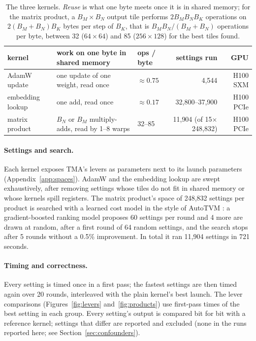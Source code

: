 \documentclass[10pt]{article}
\newcommand{\x}{\ensuremath{\times}}
\begin{document}
\begin{table}[t]
  \centering
  \caption{The three kernels. \emph{Reuse} is what one byte meets once it is in shared memory; for the matrix product,
  a $B_M \times B_N$ output tile performs $2B_MB_NB_K$ operations on $2(B_M+B_N)B_K$ bytes per step of $B_K$, that is
  $B_MB_N/(B_M+B_N)$ operations per byte, between 32 ($64\times64$) and 85 ($256\times128$) for the best tiles found.}
  \label{tab:kernels}
  \small
  \begin{tabular}{@{}lllrr@{}}
    \toprule
    kernel & work on one byte in shared memory & ops / byte & settings run & GPU \\
    \midrule
    AdamW update      & one update of one weight, read once            & $\approx 0.75$ & 4{,}544                     & H100 SXM  \\
    embedding lookup  & one add, read once                             & $\approx 0.17$ & 32{,}800--37{,}900          & H100 PCIe \\
    matrix product    & $B_N$ or $B_M$ multiply-adds, read by 1--8 warps & 32--85         & 11{,}904 (of 15\x248{,}832) & H100 PCIe \\
    \bottomrule
  \end{tabular}
\end{table}

\paragraph{Settings and search.}
Each kernel exposes TMA's levers as parameters next to its launch parameters (Appendix~\ref{app:spaces}). AdamW and the
embedding lookup are swept exhaustively, after removing settings whose tiles do not fit in shared memory or whose kernels
spill registers. The matrix product's space of 248{,}832 settings per product is searched with a learned cost model in the
style of AutoTVM \citep{chen2018autotvm}: a gradient-boosted ranking model \citep{chen2016xgboost} proposes 60 settings per
round and 4 more are drawn at random, after a first round of 64 random settings, and the search stops after 5 rounds
without a 0.5\% improvement. In total it ran 11{,}904 settings in 721 seconds.

\paragraph{Timing and correctness.}
Every setting is timed once in a first pass; the fastest settings are then timed again over 20 rounds, interleaved with
the plain kernel's best launch. The lever comparisons (Figures~\ref{fig:levers} and~\ref{fig:products}) use first-pass
times of the best setting in each group. Every setting's output is compared bit for bit with a reference kernel; settings
that differ are reported and excluded (none in the runs reported here; see Section~\ref{sec:confounders}).
\end{document}
